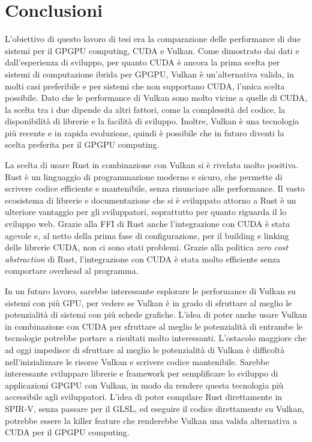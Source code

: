 \chapter{Conclusioni}
\label{sec:conclusion}

L'obiettivo di questo lavoro di tesi era la comparazione delle performance di due sistemi per il GPGPU computing, CUDA e Vulkan. Come dimostrato dai dati e dall'esperienza di sviluppo, per quanto CUDA è ancora la prima scelta per sistemi di computazione ibrida per GPGPU, Vulkan è un'alternativa valida, in molti casi preferibile e per sistemi che non supportano CUDA, l'unica scelta possibile. Dato che le performance di Vulkan sono molto vicine a quelle di CUDA, la scelta tra i due dipende da altri fattori, come la complessità del codice, la disponibilità di librerie e la facilità di sviluppo. Inoltre, Vulkan è una tecnologia più recente e in rapida evoluzione, quindi è possibile che in futuro diventi la scelta preferita per il GPGPU computing. 

La scelta di usare Rust in combinazione con Vulkan si è rivelata molto positiva. Rust è un linguaggio di programmazione moderno e sicuro, che permette di scrivere codice efficiente e mantenibile, senza rinunciare alle performance. Il vasto ecosistema di librerie e documentazione che si è sviluppato attorno a Rust è un ulteriore vantaggio per gli sviluppatori, soprattutto per quanto riguarda il lo sviluppo web. Grazie alla FFI di Rust anche l'integrazione con CUDA è stata agevole e, al netto della prima fase di configurazione, per il building e linking delle librerie CUDA, non ci sono stati problemi. Grazie alla politica \textit{zero cost abstraction} di Rust, l'integrazione con CUDA è stata molto efficiente senza comportare overhead al programma.

In un futuro lavoro, sarebbe interessante esplorare le performance di Vulkan su sistemi con più GPU, per vedere se Vulkan è in grado di sfruttare al meglio le potenzialità di sistemi con più schede grafiche. L'idea di poter anche usare Vulkan in combinazione con CUDA per sfruttare al meglio le potenzialità di entrambe le tecnologie potrebbe portare a risultati molto interessanti.
L'ostacolo maggiore che ad oggi impedisce di sfruttare al meglio le potenzialità di Vulkan è difficoltà nell'inizializzare le risorse Vulkan e scrivere codice mantenibile. Sarebbe interessante sviluppare librerie e framework per semplificare lo sviluppo di applicazioni GPGPU con Vulkan, in modo da rendere questa tecnologia più accessibile agli sviluppatori. L'idea di poter compilare Rust direttamente in SPIR-V, senza passare per il GLSL, ed eseguire il codice direttamente su Vulkan, potrebbe essere la killer feature che renderebbe Vulkan una valida alternativa a CUDA per il GPGPU computing.